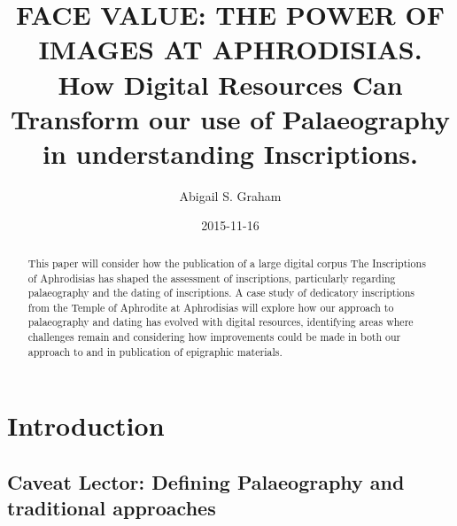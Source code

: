 \documentclass[amsthm,ebook]{saparticle}
\title{FACE VALUE: THE POWER OF IMAGES AT APHRODISIAS. How Digital Resources Can Transform our use of Palaeography in understanding Inscriptions.}
\author[war]{Abigail S. Graham\corref{first}}
\date{2015-11-16}
\begin{document}
 \maketitle
\begin{abstract}
This paper will consider how the publication of a large digital corpus The Inscriptions of Aphrodisias \citet{ReynoldsRouecheBodard2007} has shaped the assessment of inscriptions, particularly regarding palaeography and the dating
of inscriptions. A case study of dedicatory inscriptions from the Temple of Aphrodite at Aphrodisias will explore how
our approach to palaeography and dating has evolved with digital resources, identifying areas where challenges remain
and considering how improvements could be made in both our approach to and in publication of epigraphic materials. 

\end{abstract}


\section{Introduction}
\subsection{Caveat Lector: Defining Palaeography and traditional approaches}
\end{document}
